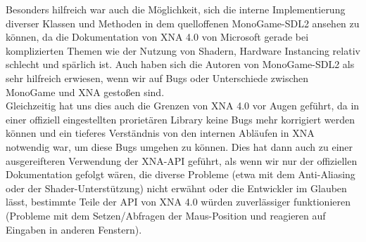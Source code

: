 Besonders hilfreich war auch die Möglichkeit, sich die interne Implementierung diverser Klassen und Methoden in dem quelloffenen MonoGame-SDL2 ansehen zu können, da die Dokumentation von XNA 4.0 von Microsoft gerade bei komplizierten Themen wie der Nutzung von Shadern, Hardware Instancing relativ schlecht und spärlich ist. Auch haben sich die Autoren von MonoGame-SDL2 als sehr hilfreich erwiesen, wenn wir auf Bugs oder Unterschiede zwischen MonoGame und XNA gestoßen sind. \\
Gleichzeitig hat uns dies auch die Grenzen von XNA 4.0 vor Augen geführt, da in einer offiziell eingestellten prorietären Library keine Bugs mehr korrigiert werden können und ein tieferes Verständnis von den internen Abläufen in XNA notwendig war, um diese Bugs umgehen zu können. Dies hat dann auch zu einer ausgereifteren Verwendung der XNA-API geführt, als wenn wir nur der offiziellen Dokumentation gefolgt wären, die diverse Probleme (etwa mit dem Anti-Aliasing oder der Shader-Unterstützung) nicht erwähnt oder die Entwickler im Glauben lässt, bestimmte Teile der API von XNA 4.0 würden zuverlässiger funktionieren (Probleme mit dem Setzen/Abfragen der Maus-Position und reagieren auf Eingaben in anderen Fenstern).\\







